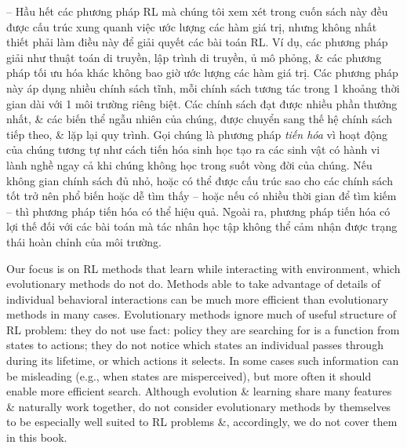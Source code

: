 \documentclass{article}
\begin{document}
\begin{itemize}
\begin{itemize}
        -- Hầu hết các phương pháp RL mà chúng tôi xem xét trong cuốn sách này đều được cấu trúc xung quanh việc ước lượng các hàm giá trị, nhưng không nhất thiết phải làm điều này để giải quyết các bài toán RL. Ví dụ, các phương pháp giải như thuật toán di truyền, lập trình di truyền, ủ mô phỏng, \& các phương pháp tối ưu hóa khác không bao giờ ước lượng các hàm giá trị. Các phương pháp này áp dụng nhiều chính sách tĩnh, mỗi chính sách tương tác trong 1 khoảng thời gian dài với 1 môi trường riêng biệt. Các chính sách đạt được nhiều phần thưởng nhất, \& các biến thể ngẫu nhiên của chúng, được chuyển sang thế hệ chính sách tiếp theo, \& lặp lại quy trình. Gọi chúng là phương pháp {\it tiến hóa} vì hoạt động của chúng tương tự như cách tiến hóa sinh học tạo ra các sinh vật có hành vi lành nghề ngay cả khi chúng không học trong suốt vòng đời của chúng. Nếu không gian chính sách đủ nhỏ, hoặc có thể được cấu trúc sao cho các chính sách tốt trở nên phổ biến hoặc dễ tìm thấy -- hoặc nếu có nhiều thời gian để tìm kiếm -- thì phương pháp tiến hóa có thể hiệu quả. Ngoài ra, phương pháp tiến hóa có lợi thế đối với các bài toán mà tác nhân học tập không thể cảm nhận được trạng thái hoàn chỉnh của môi trường.

        Our focus is on RL methods that learn while interacting with environment, which evolutionary methods do not do. Methods able to take advantage of details of individual behavioral interactions can be much more efficient than evolutionary methods in many cases. Evolutionary methods ignore much of useful structure of RL problem: they do not use fact: policy they are searching for is a function from states to actions; they do not notice which states an individual passes through during its lifetime, or which actions it selects. In some cases such information can be misleading (e.g., when states are misperceived), but more often it should enable more efficient search. Although evolution \& learning share many features \& naturally work together, do not consider evolutionary methods by themselves to be especially well suited to RL problems \&, accordingly, we do not cover them in this book.


\end{itemize}
\end{itemize}
\end{document}
